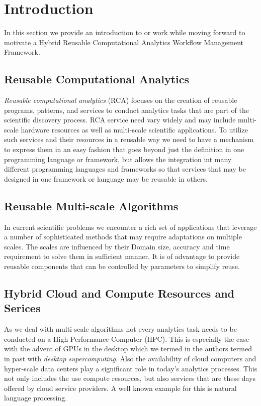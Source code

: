 
\section{Introduction}

In this section we provide an introduction to or work while 
moving forward to motivate a 
Hybrid Reusable Computational Analytics Workflow
Management Framework.

\subsection{Reusable Computational Analytics}

{\em Reusable computational analytics} (RCA) focuses on  the creation of reusable programs, patterns, and services to conduct analytics tasks that are part of the scientific discovery process.  RCA service need vary widely and may include multi-scale hardware resources as well as multi-scale scientific applications. To utilize such services and their resources in a reusable way we need to have a mechanism to express them in an easy fashion that goes beyond just the definition in one programming language or framework, but allows the integration int many different programming languages and frameworks so that services that may be designed in one framework or language may be reusable in others.

\subsection{Reusable Multi-scale Algorithms}

In current scientific problems we encounter a rich set of applications that leverage a number of sophisticated methods that may require adaptations on multiple scales. The scales are influenced by their Domain size, accuracy and time requirement to solve them in sufficient manner. It is of advantage to provide reusable components that can be controlled by parameters to simplify reuse.

\subsection{Hybrid Cloud and Compute Resources and Serices}

As we deal with multi-scale algorithms not every analytics task needs to be conducted on a High Performance Computer (HPC). This is especially the case with the advent of GPUs in the desktop which we termed in the authors termed in past with {\em desktop supercomputing}. Also the availability of cloud computers and hyper-scale data centers play a significant role in today's analytics processes. This not only includes the use compute resources, but also services that are these days offered by cloud service providers. A well known example for this is natural language processing.

